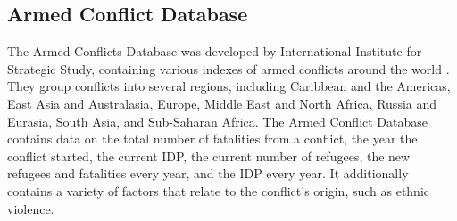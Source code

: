 \subsection{Armed Conflict Database}
The Armed Conflicts Database was developed by International Institute for Strategic Study, containing various indexes of armed conflicts around the world \cite{(conflictDB)}. They group conflicts into several regions, including Caribbean and the Americas, East Asia and Australasia, Europe, Middle East and North Africa, Russia and Eurasia, South Asia, and Sub-Saharan Africa. The Armed Conflict Database contains data on the total number of fatalities from a conflict, the year the conflict started, the current IDP, the current number of refugees, the new refugees and fatalities every year, and the IDP every year. It additionally contains a variety of factors that relate to the conflict's origin, such as ethnic violence. 




